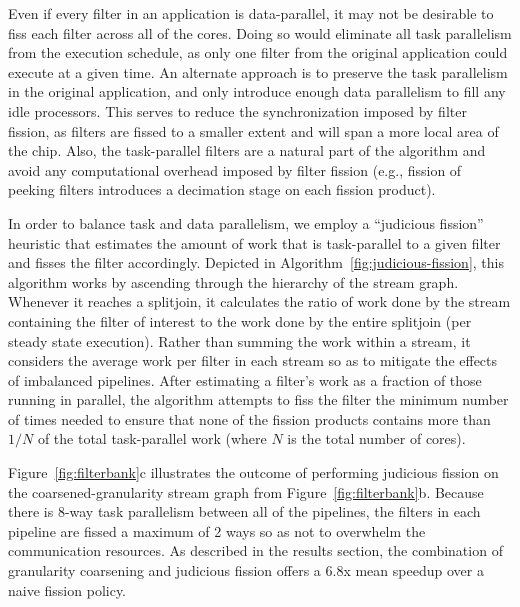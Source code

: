 Even if every filter in an application is data-parallel, it may not be
desirable to fiss each filter across all of the cores.  Doing so would
eliminate all task parallelism from the execution schedule, as only
one filter from the original application could execute at a given
time.  An alternate approach is to preserve the task parallelism in
the original application, and only introduce enough data parallelism
to fill any idle processors.  This serves to reduce the
synchronization imposed by filter fission, as filters are fissed to a
smaller extent and will span a more local area of the chip.  Also, the
task-parallel filters are a natural part of the algorithm and avoid
any computational overhead imposed by filter fission (e.g., fission of
peeking filters introduces a decimation stage on each fission
product).

In order to balance task and data parallelism, we employ a ``judicious
fission'' heuristic that estimates the amount of work that is
task-parallel to a given filter and fisses the filter accordingly.
Depicted in Algorithm~\ref{fig:judicious-fission}, this algorithm
works by ascending through the hierarchy of the stream graph.
Whenever it reaches a splitjoin, it calculates the ratio of work done
by the stream containing the filter of interest to the work done by
the entire splitjoin (per steady state execution).  Rather than
summing the work within a stream, it considers the average work per
filter in each stream so as to mitigate the effects of imbalanced
pipelines.
After estimating a filter's work as a fraction of those running in
parallel, the algorithm attempts to fiss the filter the minimum number
of times needed to ensure that none of the fission products contains
more than $1/N$ of the total task-parallel work (where $N$ is the
total number of cores).

Figure~\ref{fig:filterbank}c illustrates the outcome of performing
judicious fission on the coarsened-granularity stream graph from
Figure~\ref{fig:filterbank}b.  Because there is 8-way task
parallelism between all of the pipelines, the filters in each pipeline
are fissed a maximum of 2 ways so as not to overwhelm the
communication resources.  As described in the results section, the
combination of granularity coarsening and judicious fission offers
a 6.8x mean speedup over a naive fission policy.
